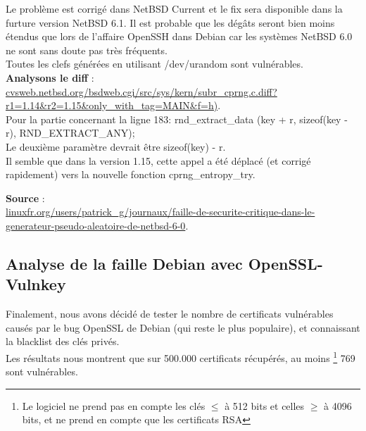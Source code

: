 \documentclass{article}
\begin{document}
	Le problème est corrigé dans NetBSD Current et le fix sera disponible dans 
	la furture version NetBSD 6.1.
	Il est probable que les dégâts seront bien moins étendus que lors de l'affaire 
	OpenSSH dans Debian car les systèmes NetBSD 6.0 ne sont sans doute pas très 
	fréquents.\\
	
	Toutes les clefs générées en utilisant /dev/urandom sont vulnérables.\\

	\textbf{Analysons le diff} : \\
	\href{http://cvsweb.netbsd.org/bsdweb.cgi/src/sys/kern/subr\_cprng.c.diff?r1=1.14\&r2=1.15\&only\_with\_tag=MAIN\&f=h)}
	{cvsweb.netbsd.org/bsdweb.cgi/src/sys/kern/subr\_cprng.c.diff?r1=1.14\&r2=1.15\&only\_with\_tag=MAIN\&f=h)}. \\ 
	
	Pour la partie concernant la ligne 183: rnd\_extract\_data
	(key + r, sizeof(key - r), RND\_EXTRACT\_ANY);\\
	
	Le deuxième paramètre devrait être sizeof(key) - r.\\
	
	Il semble que dans la version 1.15, cette appel a été déplacé (et corrigé
	rapidement) vers la nouvelle fonction cprng\_entropy\_try.

	\textbf{Source} : \\
	\href{http://linuxfr.org/users/patrick\_g/journaux/faille-de-securite-critique-dans-le-generateur-pseudo-aleatoire-de-netbsd-6-0}
	{linuxfr.org/users/patrick\_g/journaux/faille-de-securite-critique-dans-le-generateur-pseudo-aleatoire-de-netbsd-6-0}.\\
	
	\subsection{Analyse de la faille Debian avec OpenSSL-Vulnkey}
	
	Finalement, nous avons décidé de tester le nombre de certificats vulnérables 
	causés 	par le bug OpenSSL de Debian (qui reste le plus populaire), et
	connaissant la blacklist des clés privés. \\
	
	Les résultats nous montrent que sur 500.000 certificats récupérés, au moins
	\footnote{Le logiciel ne prend pas en compte les clés $\leq$ à 512 bits et 
	celles $\geq$ à 4096 bits, et ne prend en compte que les certificats RSA} 
	769 sont vulnérables.\\
\end{document}
